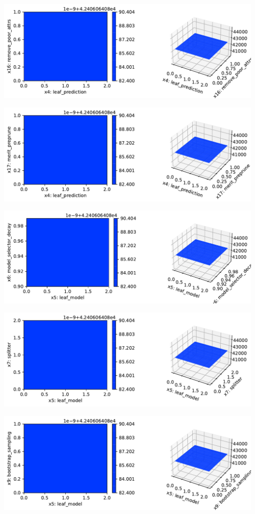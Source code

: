 \documentclass[
  letterpaper,
  DIV=11,
  numbers=noendperiod]{scrreprt}
\begin{document}
\includegraphics{024_spot_hpt_river_friedman_hatr_files/figure-pdf/cell-42-output-60.pdf}

\includegraphics{024_spot_hpt_river_friedman_hatr_files/figure-pdf/cell-42-output-61.pdf}

\includegraphics{024_spot_hpt_river_friedman_hatr_files/figure-pdf/cell-42-output-62.pdf}

\includegraphics{024_spot_hpt_river_friedman_hatr_files/figure-pdf/cell-42-output-63.pdf}

\includegraphics{024_spot_hpt_river_friedman_hatr_files/figure-pdf/cell-42-output-64.pdf}
\end{document}

